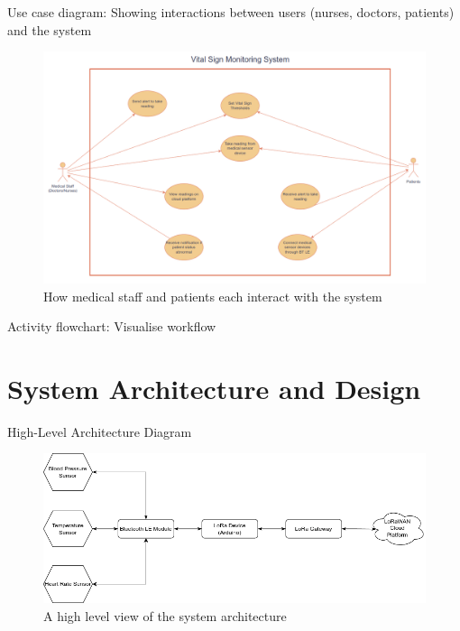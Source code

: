 Use case diagram: Showing interactions between users (nurses, doctors, patients) and the system
\begin{figure}[H]
	\centering
	\includegraphics[width=\textwidth]{diagrams/use_case_diagram}
	\caption{How medical staff and patients each interact with the system}
	\label{fig:use_case_diagram}
\end{figure}

Activity flowchart: Visualise workflow

\section{System Architecture and Design} %

High-Level Architecture Diagram

\begin{figure}[H]
\centering
\includegraphics[width=\textwidth]{diagrams/high_level_architecture}
\caption{A high level view of the system architecture}
\label{fig:high_level_architecture_diagram}
\end{figure}

